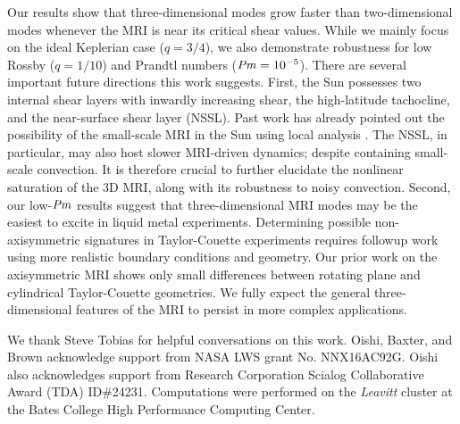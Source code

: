\documentclass[aps,prl,reprint,superscriptaddress]{revtex4-1}
\newcommand{\Prm}{\mbox{\textit{Pm}}}
\begin{document}
Our results show that three-dimensional modes grow faster than two-dimensional modes whenever the MRI is near its critical shear values.
While we mainly focus on the ideal Keplerian case ($q=3/4$), we also demonstrate robustness for low Rossby ($q=1/10$) and Prandtl numbers ($\Prm=10^{-5}$).
There are several important future directions this work suggests.
First, the Sun possesses two internal shear layers with inwardly increasing shear, the high-latitude tachocline, and the near-surface shear layer (NSSL). 
Past work has already pointed out the possibility of the small-scale MRI in the Sun using local analysis \citep{2007ApJ...667L.207P,2011MNRAS.411L..26M,2014ApJ...787...21K}.
The NSSL, in particular, may also host slower MRI-driven dynamics; despite containing small-scale convection.
It is therefore crucial to further elucidate the nonlinear saturation of the 3D MRI, along with its robustness to noisy convection.
Second, our low-$\Prm$ results suggest that three-dimensional MRI modes may be the easiest to excite in liquid metal experiments.
Determining possible non-axisymmetric signatures in Taylor-Couette experiments requires followup work using more realistic boundary conditions and geometry. 
Our prior work on the axisymmetric MRI \citep{2017ApJ...841....1C,2017ApJ...841....2C} shows only small differences between rotating plane and cylindrical Taylor-Couette geometries. 
We fully expect the general three-dimensional features of the MRI to persist in more complex applications. 


\begin{acknowledgments}
We thank Steve Tobias for helpful conversations on this work.
Oishi, Baxter, and Brown acknowledge support from NASA LWS grant No. NNX16AC92G.
Oishi also acknowledges support from Research Corporation Scialog Collaborative Award (TDA) ID\#24231. 
Computations were performed on the \emph{Leavitt} cluster at the Bates College High Performance Computing Center.

\end{acknowledgments}


\end{document}
